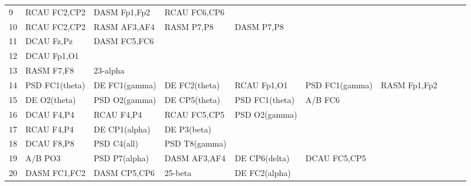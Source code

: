 \begin{landscape}
\begin{table}[]
\begin{tabular}{l|llllllll}
9        & RCAU FC2,CP2   & DASM Fp1,Fp2   & RCAU FC6,CP6   &                &                &                &                &                &               &              \\
10       & RCAU FC2,CP2   & RASM AF3,AF4   & RASM P7,P8     & DASM P7,P8     &                &                &                &                &               &              \\
11       & DCAU Fz,Pz     & DASM FC5,FC6   &                &                &                &                &                &                &               &              \\
12       & DCAU Fp1,O1    &                &                &                &                &                &                &                &               &              \\
13       & RASM F7,F8     & 23-alpha       &                &                &                &                &                &                &               &              \\
14       & PSD FC1(theta) & DE FC1(gamma)  & DE FC2(theta)  & RCAU Fp1,O1    & PSD FC1(gamma) & RASM Fp1,Fp2   &                &                &               &              \\
15       & DE O2(theta)   & PSD O2(gamma)  & DE CP5(theta)  & PSD FC1(theta) & A/B FC6        &                &                &                &               &              \\
16       & DCAU F4,P4     & RCAU F4,P4     & RCAU FC5,CP5   & PSD O2(gamma)  &                &                &                &                &               &              \\
17       & RCAU F4,P4     & DE CP1(alpha)  & DE P3(beta)    &                &                &                &                &                &               &              \\
18       & DCAU F8,P8     & PSD C4(all)    & PSD T8(gamma)  &                &                &                &                &                &               &              \\
19       & A/B PO3        & PSD P7(alpha)  & DASM AF3,AF4   & DE CP6(delta)  & DCAU FC5,CP5   &                &                &                &               &              \\
20       & DASM FC1,FC2   & DASM CP5,CP6   & 25-beta        & DE FC2(alpha)  &                &                &                &                &               &              \\

\end{tabular}
\end{table}
\end{landscape}

